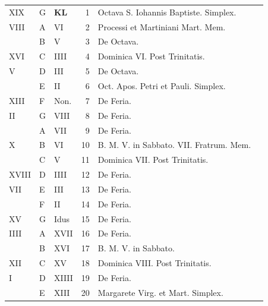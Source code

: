 \begin{center}
\begin{tabular}{l | l | l | r | l l}
\color{Red} XIX & G & \textbf{\color{Red} K\color{Blue}L} & 1 & Octava S. Iohannis Baptiste. Simplex. & \color{Red} \\
\color{Red} VIII & \color{Red} A & \color{Red} VI & 2 & Processi et Martiniani Mart. Mem. & \color{Red} \\
\color{Red}  & B & \color{Red} V & 3 & De Octava. & \color{Red} \\
\color{Red} XVI & C & \color{Red} IIII & 4 & Dominica VI. Post Trinitatis. \\
\color{Red} V & D & \color{Red} III & 5 & De Octava. & \color{Red} \\
\color{Red}  & E & \color{Red} II & 6 & \color{Red} Oct. Apos. Petri et Pauli. Simplex. \\
\color{Red} XIII & F & \color{Red} Non. & 7 & De Feria. & \color{Red} \\
\color{Red} II & G & \color{Red} VIII & 8 & De Feria. & \color{Red} \\
\color{Red}  & \color{Red} A & \color{Red} VII & 9 & De Feria. & \color{Red} \\
\color{Red} X & B & \color{Red} VI & 10 & B. M. V. in Sabbato. VII. Fratrum. Mem. \\
\color{Red}  & C & \color{Red} V & 11 & Dominica VII. Post Trinitatis. & \color{Red} \\
\color{Red} XVIII & D & \color{Red} IIII & 12 & De Feria.  & \color{Red} \\
\color{Red} VII & E & \color{Red} III & 13 & De Feria. & \color{Red} \\
\color{Red}  & F & \color{Red} II & 14 & De Feria. \\
\color{Red} XV & G & \color{Red} Idus & 15 & De Feria. & \color{Red} \\
\color{Red} IIII & \color{Red} A & \color{Red} XVII & 16 & De Feria. \\
\color{Red}  & B & \color{Red} XVI & 17 & B. M. V. in Sabbato. & \color{Red} \\
\color{Red} XII & C & \color{Red} XV & 18 & Dominica VIII. Post Trinitatis. \\
\color{Red} I & D & \color{Red} XIIII & 19 & De Feria. & \color{Red} \\
\color{Red}  & E & \color{Red} XIII & 20 & Margarete Virg. et Mart. Simplex. & \color{Red} \\

\end{tabular}
\end{center}
